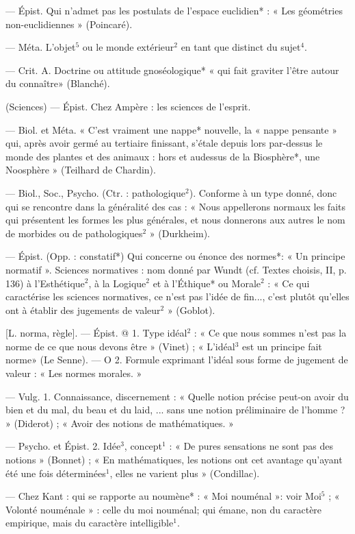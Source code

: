 \begin{itemize}[leftmargin=1cm, label=, itemsep=1pt]
 — Épist. Qui n’admet
pas les postulats de l’espace euclidien* : « Les géométries non-euclidiennes » (Poincaré).

 — Méta. L'objet$^5$ ou le
monde extérieur$^2$ en tant que distinct du sujet$^4$.

 — Crit. A. Doctrine ou
attitude gnoséologique* « qui fait
graviter l’être autour du connaître»
(Blanché).

 (Sciences) — Épist. Chez
Ampère : les sciences de l'esprit.

 — Biol. et Méta. « C'est
vraiment une nappe* nouvelle, la
« nappe pensante » qui, après avoir
germé au tertiaire finissant, s'étale
depuis lors par-dessus le monde des
plantes et des animaux : hors et audessus de la Biosphère*, une Noosphère » (Teilhard de Chardin).

 — Biol., Soc., Psycho. (Ctr. :
pathologique$^2$). Conforme à un type
donné, donc qui se rencontre dans
la généralité des cas : « Nous appellerons normaux les faits qui présentent les formes les plus générales,
et nous donnerons aux autres le
nom de morbides ou de pathologiques$^2$ » (Durkheim).

 — Épist. (Opp. : constatif*)
Qui concerne ou énonce des normes*:
« Un principe normatif ». Sciences
normatives : nom donné par Wundt
(cf. Textes choisis, II, p. 136) à
l'Esthétique$^2$, à la Logique$^2$ et à
l'Éthique* ou Morale$^2$ : « Ce qui
caractérise les sciences normatives,
ce n’est pas l'idée de fin..., c’est
plutôt qu’elles ont à établir des jugements de valeur$^2$ » (Goblot).

 [L. norma, règle]. — Épist.
@ 1. Type idéal$^2$ : « Ce que nous
sommes n’est pas la norme de ce
que nous devons être » (Vinet) ;
« L'idéal$^3$ est un principe fait norme»
(Le Senne). — O 2. Formule exprimant l'idéal sous forme de jugement de valeur : « Les normes morales. »

 — Vulg. 1. Connaissance, discernement : « Quelle notion précise
peut-on avoir du bien et du mal,
du beau et du laid, ... sans une notion préliminaire de l’homme ? »
(Diderot) ; « Avoir des notions de
mathématiques. »

— Psycho. et Épist. 2. Idée$^3$,
concept$^1$ : « De pures sensations ne
sont pas des notions » (Bonnet) ;
« En mathématiques, les notions
ont cet avantage qu'ayant été une
fois déterminées$^1$, elles ne varient
plus » (Condillac).

 — Chez Kant : qui se rapporte au noumène* : « Moi nouménal »: voir Moi$^5$ ; « Volonté nouménale » : celle du moi nouménal; qui
émane, non du caractère empirique,
mais du caractère intelligible$^1$.


\end{itemize}
